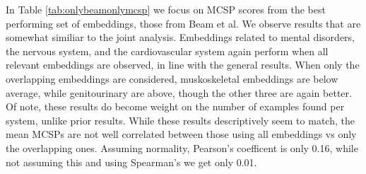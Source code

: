 \documentclass[10pt]{article}
\begin{document}
In Table \ref{tab:onlybeamonlymcsp} we focus on MCSP scores from the best performing set of embeddings, those from Beam et al. We observe results that are somewhat similiar to the joint analysis. Embeddings related to mental disorders, the nervous system, and the cardiovascular system again perform when all relevant embeddings are observed, in line with the general results. When only the overlapping embeddings are considered, muskoskeletal embeddings are below average, while genitourinary are above, though the other three are again better. Of note, these results do become weight on the number of examples found per system, unlike prior results. While these results descriptively seem to match, the mean MCSPs are not well correlated between those using all embeddings vs only the overlapping ones. Assuming normality, Pearson's coefficent is only 0.16, while not assuming this and using Spearman's we get only 0.01. 
\end{document}
